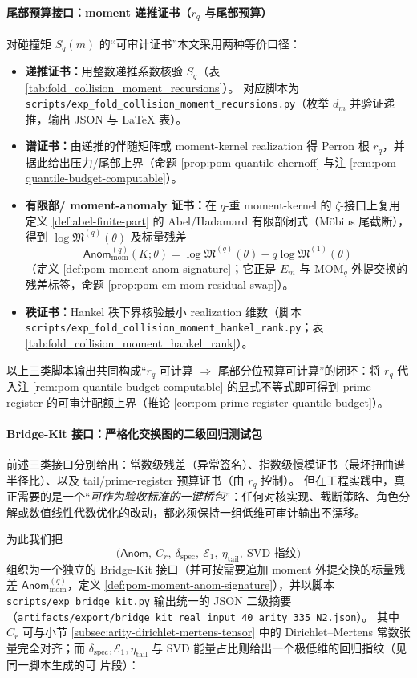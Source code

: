 \paragraph{尾部预算接口：moment 递推证书（\texorpdfstring{$r_q$}{rq} 与尾部预算）}
对碰撞矩 \(S_q(m)\) 的“可审计证书”本文采用两种等价口径：
\begin{itemize}
  \item \textbf{递推证书：}用整数递推系数核验 \(S_q\)（表 \ref{tab:fold_collision_moment_recursions}）。
  对应脚本为 \texttt{scripts/exp\_fold\_collision\_moment\_recursions.py}（枚举 \(d_m\) 并验证递推，输出 JSON 与 LaTeX 表）。
  \item \textbf{谱证书：}由递推的伴随矩阵或 moment-kernel realization 得 Perron 根 \(r_q\)，并据此给出压力/尾部上界（命题 \ref{prop:pom-quantile-chernoff} 与注 \ref{rem:pom-quantile-budget-computable}）。
  \item \textbf{有限部/ moment-anomaly 证书：}在 \(q\)-重 moment-kernel 的 \(\zeta\)-接口上复用定义 \ref{def:abel-finite-part} 的 Abel/Hadamard 有限部闭式（Möbius 尾截断），得到 \(\log\mathfrak{M}^{(q)}(\theta)\) 及标量残差
  \[
  \mathsf{Anom}^{(q)}_{\mathrm{mom}}(K;\theta)=\log\mathfrak{M}^{(q)}(\theta)-q\log\mathfrak{M}^{(1)}(\theta)
  \]
  （定义 \ref{def:pom-moment-anom-signature}；它正是 \(E_m\) 与 \(\mathrm{MOM}_q\) 外提交换的残差标签，命题 \ref{prop:pom-em-mom-residual-swap}）。
  \item \textbf{秩证书：}Hankel 秩下界核验最小 realization 维数（脚本 \texttt{scripts/exp\_fold\_collision\_moment\_hankel\_rank.py}；表 \ref{tab:fold_collision_moment_hankel_rank}）。
  \end{itemize}

以上三类脚本输出共同构成“\(r_q\) 可计算 \(\Rightarrow\) 尾部分位预算可计算”的闭环：将 \(r_q\) 代入注 \ref{rem:pom-quantile-budget-computable} 的显式不等式即可得到 prime-register 的可审计配额上界（推论 \ref{cor:pom-prime-register-quantile-budget}）。

\paragraph{Bridge-Kit 接口：严格化交换图的二级回归测试包}
前述三类接口分别给出：常数级残差（异常签名）、指数级慢模证书（最坏扭曲谱半径比）、以及 tail/prime-register 预算证书（由 \(r_q\) 控制）。
但在工程实践中，真正需要的是一个“\emph{可作为验收标准的一键桥包}”：任何对核实现、截断策略、角色分解或数值线性代数优化的改动，都必须保持一组低维可审计输出不漂移。
\par
为此我们把
\[
\bigl(\mathsf{Anom},\ C_r,\ \delta_{\mathrm{spec}},\ \mathcal{E}_1,\ \eta_{\mathrm{tail}},\ \text{SVD 指纹}\bigr)
\]
组织为一个独立的 Bridge-Kit 接口（并可按需要追加 moment 外提交换的标量残差 \(\mathsf{Anom}^{(q)}_{\mathrm{mom}}\)，定义 \ref{def:pom-moment-anom-signature}），并以脚本
\texttt{scripts/exp\_bridge\_kit.py}
输出统一的 JSON 二级摘要（\texttt{artifacts/export/bridge\_kit\_real\_input\_40\_arity\_335\_N2.json}）。
其中 \(C_r\) 可与小节 \ref{subsec:arity-dirichlet-mertens-tensor} 中的 Dirichlet--Mertens 常数张量完全对齐；而 \(\delta_{\mathrm{spec}},\mathcal{E}_1,\eta_{\mathrm{tail}}\) 与 SVD 能量占比则给出一个极低维的回归指纹（见同一脚本生成的可 \verb|| 片段）：


